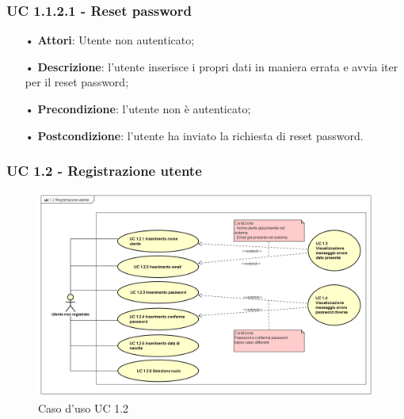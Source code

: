 \subsubsection{UC 1.1.2.1 - Reset password}
\begin{itemize}
	\item[•]\textbf{Attori}: Utente non autenticato;
	\item[•]\textbf{Descrizione}: l’utente inserisce i propri dati in maniera errata e avvia iter per il reset password;
	\item[•]\textbf{Precondizione}: l’utente non è autenticato;
	\item[•]\textbf{Postcondizione}: l’utente ha inviato la richiesta di reset password.
\end{itemize}

\subsubsection{UC 1.2 - Registrazione utente}
\begin{figure}[H]
	\centering
	\includegraphics[width=17cm]{img/UC12.png} 
	\caption{Caso d'uso UC 1.2}\label{fig:12}
\end{figure}

